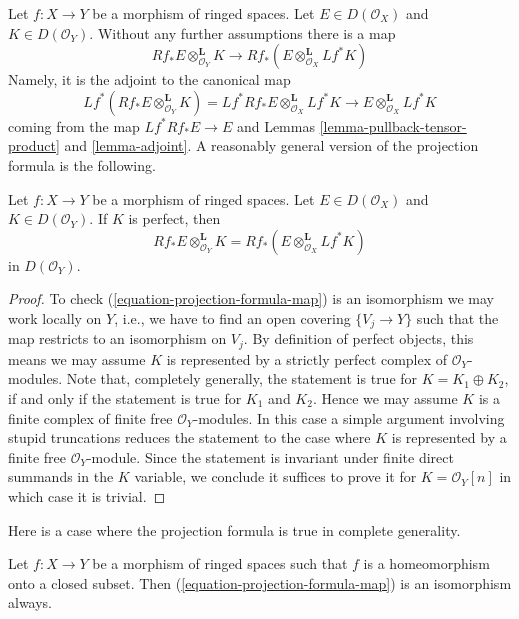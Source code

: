 \noindent
Let $f : X \to Y$ be a morphism of ringed spaces.
Let $E \in D(\mathcal{O}_X)$ and $K \in D(\mathcal{O}_Y)$.
Without any further assumptions there is a map
\begin{equation}
\label{equation-projection-formula-map}
Rf_*E \otimes^\mathbf{L}_{\mathcal{O}_Y} K
\longrightarrow
Rf_*(E \otimes^\mathbf{L}_{\mathcal{O}_X} Lf^*K)
\end{equation}
Namely, it is the adjoint to the canonical map
$$
Lf^*(Rf_*E \otimes^\mathbf{L}_{\mathcal{O}_Y} K) =
Lf^*Rf_*E \otimes^\mathbf{L}_{\mathcal{O}_X} Lf^*K
\longrightarrow
E \otimes^\mathbf{L}_{\mathcal{O}_X} Lf^*K
$$
coming from the map $Lf^*Rf_*E \to E$ and Lemmas
\ref{lemma-pullback-tensor-product} and \ref{lemma-adjoint}.
A reasonably general version of the projection formula is the following.

\begin{lemma}
\label{lemma-projection-formula-perfect}
Let $f : X \to Y$ be a morphism of ringed spaces.
Let $E \in D(\mathcal{O}_X)$ and $K \in D(\mathcal{O}_Y)$.
If $K$ is perfect, then
$$
Rf_*E \otimes^\mathbf{L}_{\mathcal{O}_Y} K =
Rf_*(E \otimes^\mathbf{L}_{\mathcal{O}_X} Lf^*K)
$$
in $D(\mathcal{O}_Y)$.
\end{lemma}

\begin{proof}
To check (\ref{equation-projection-formula-map}) is an isomorphism
we may work locally on $Y$, i.e., we have to find an open covering
$\{V_j \to Y\}$
such that the map restricts to an isomorphism on $V_j$. By definition
of perfect objects, this means we may assume $K$ is represented by
a strictly perfect complex of $\mathcal{O}_Y$-modules.
Note that, completely generally, the statement is true for
$K = K_1 \oplus K_2$, if and only if the statement is true for
$K_1$ and $K_2$. Hence we may assume $K$ is a finite
complex of finite free $\mathcal{O}_Y$-modules.
In this case a simple argument involving stupid truncations reduces
the statement to the case where $K$ is represented by a finite
free $\mathcal{O}_Y$-module. Since the statement is invariant
under finite direct summands in the $K$ variable, we conclude
it suffices to prove it for $K = \mathcal{O}_Y[n]$
in which case it is trivial.
\end{proof}

\noindent
Here is a case where the projection formula is true in complete
generality.

\begin{lemma}
\label{lemma-projection-formula-closed-immersion}
Let $f : X \to Y$ be a morphism of ringed spaces such that $f$ is a
homeomorphism onto a closed subset. Then
(\ref{equation-projection-formula-map}) is an isomorphism always.
\end{lemma}

